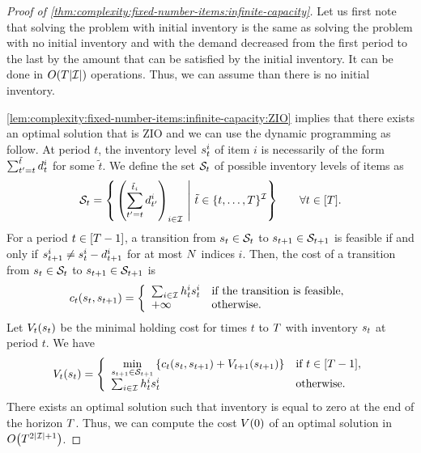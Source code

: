 \begin{proof}[Proof of \cref{thm:complexity:fixed-number-items:infinite-capacity}]
Let us first note that solving the problem with initial inventory is the same as solving the problem with no initial inventory and with the demand decreased from the first period to the last by the amount that can be satisfied by the initial inventory.
It can be done in $O\bracket{T\card{\REF}}$ operations.
Thus, we can assume than there is no initial inventory.


\cref{lem:complexity:fixed-number-items:infinite-capacity:ZIO} implies that there exists an optimal solution that is ZIO and we can use the dynamic programming as follow.
At period $t$, the inventory level $s_t^i$ of item $i$ is necessarily of the form $\sum_{t'=t}^{\tilde{t}}d_t^i$ for some $\tilde{t}$.
We define the set $\mathcal{S}_t$ of possible inventory levels of items as
\begin{equation}
\cS_t =
\left\{
\left.
\bracket{\sum_{t'=t}^{\tilde{t}_i}\demand_{t'}^i}_{i\in\REF}
\ \right| \ 
\tilde{t} \in \range[t]{\horizon}^{\REF}
\right\}\qquad\forall t\in\range{\horizon}.
\end{equation}
For a period $t\in\range{\horizon-1}$, a transition from $s_t\in\mathcal{S}_t$ to $s_{t+1}\in\mathcal{S}_{t+1}$ is feasible if and only if $s_{t+1}^i\ne s_t^i-d_{t+1}^i$ for at most $N$ indices $i$.
Then, the cost of a transition from $s_t\in\mathcal{S}_t$ to $s_{t+1}\in\mathcal{S}_{t+1}$ is
\begin{equation}
c_t\bracket{\inventory_t,\inventory_{t+1}} =
\left\{
\begin{array}{ll}
\sum_{i\in\REF}\holding_t^i\inventory_t^i & \mbox{if the transition is feasible},
\\
+\infty & \mbox{otherwise}.
\end{array}
\right.
\end{equation}
Let $V_t\bracket{\inventory_t}$ be the minimal holding cost for times $t$ to $T$ with inventory $s_t$ at period $t$.
We have
\begin{equation}
V_t\bracket{\inventory_t} =
\left\{
\begin{array}{ll}
\ds \min_{\inventory_{t+1}\in\cS_{t+1}} \crbracket{c_t\bracket{\inventory_t,\inventory_{t+1}} + V_{t+1}\bracket{\inventory_{t+1}}}
&
\mbox{if}\ t\in\range{\horizon-1},
\\
\sum_{i\in\REF}\holding_t^i\inventory_t^i
&
\mbox{otherwise}.
\end{array}
\right.
\end{equation}
There exists an optimal solution such that inventory is equal to zero at the end of the horizon $T$.
Thus, we can compute the cost $V\bracket{0}$ of an optimal solution in $O\bracket{\horizon^{2\card{\REF}+1}}$.
\end{proof}


